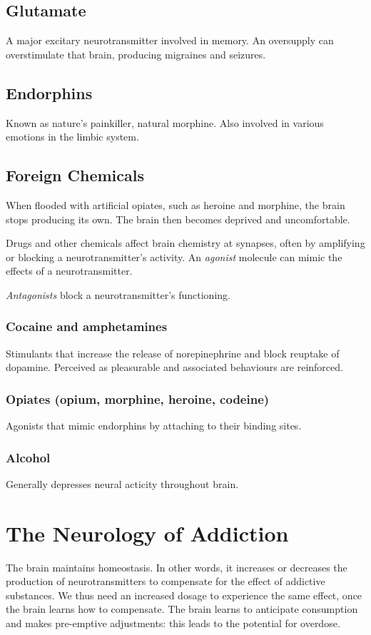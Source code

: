 \documentclass[12pt]{article}
\begin{document}
\subsection*{Glutamate}
A major excitary neurotransmitter involved in memory. An oversupply can overstimulate that brain, producing migraines and seizures.

\subsection*{Endorphins}
Known as nature's painkiller, natural morphine. Also involved in various emotions in the limbic system.

\subsection*{Foreign Chemicals}
When flooded with artificial opiates, such as heroine and morphine, the brain stops producing its own. The brain then becomes deprived and uncomfortable.

Drugs and other chemicals affect brain chemistry at synapses, often by amplifying or blocking a neurotransmitter's activity. An \textit{agonist} molecule can mimic the effects of a neurotransmitter.

\textit{Antagonists} block a neurotransmitter's functioning.

\subsubsection*{Cocaine and amphetamines}
Stimulants that increase the release of norepinephrine and block reuptake of dopamine. Perceived as pleasurable and associated behaviours are reinforced.

\subsubsection*{Opiates (opium, morphine, heroine, codeine)}
Agonists that mimic endorphins by attaching to their binding sites.

\subsubsection*{Alcohol}
Generally depresses neural acticity throughout brain.

\section*{The Neurology of Addiction}
The brain maintains homeostasis. In other words, it increases or decreases the production of neurotransmitters to compensate for the effect of addictive substances. We thus need an increased dosage to experience the same effect, once the brain learns how to compensate. The brain learns to anticipate consumption and makes pre-emptive adjustments: this leads to the potential for overdose.
\end{document}
